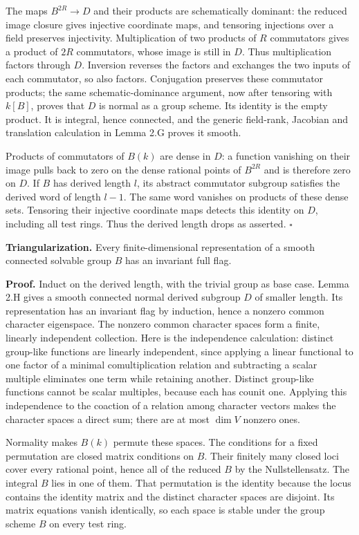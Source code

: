 \documentclass[11pt,a4paper,openany]{report}
\begin{document}
The maps \(B^{2R}\to D\) and their products are schematically dominant: the reduced image closure gives injective coordinate maps, and tensoring injections over a field preserves injectivity. Multiplication of two products of \(R\) commutators gives a product of \(2R\) commutators, whose image is still in \(D\). Thus multiplication factors through \(D\). Inversion reverses the factors and exchanges the two inputs of each commutator, so also factors. Conjugation preserves these commutator products; the same schematic-dominance argument, now after tensoring with \(k[B]\), proves that \(D\) is normal as a group scheme. Its identity is the empty product. It is integral, hence connected, and the generic field-rank, Jacobian and translation calculation in Lemma 2.G proves it smooth.

Products of commutators of \(B(k)\) are dense in \(D\): a function vanishing on their image pulls back to zero on the dense rational points of \(B^{2R}\) and is therefore zero on \(D\). If \(B\) has derived length \(l\), its abstract commutator subgroup satisfies the derived word of length \(l-1\). The same word vanishes on products of these dense sets. Tensoring their injective coordinate maps detects this identity on \(D\), including all test rings. Thus the derived length drops as asserted. \(\square\)

\textbf{Triangularization.} Every finite-dimensional representation of a smooth connected solvable group \(B\) has an invariant full flag.

\textbf{Proof.} Induct on the derived length, with the trivial group as base case. Lemma 2.H gives a smooth connected normal derived subgroup \(D\) of smaller length. Its representation has an invariant flag by induction, hence a nonzero common character eigenspace. The nonzero common character spaces form a finite, linearly independent collection. Here is the independence calculation: distinct group-like functions are linearly independent, since applying a linear functional to one factor of a minimal comultiplication relation and subtracting a scalar multiple eliminates one term while retaining another. Distinct group-like functions cannot be scalar multiples, because each has counit one. Applying this independence to the coaction of a relation among character vectors makes the character spaces a direct sum; there are at most \(\dim V\) nonzero ones.

Normality makes \(B(k)\) permute these spaces. The conditions for a fixed permutation are closed matrix conditions on \(B\). Their finitely many closed loci cover every rational point, hence all of the reduced \(B\) by the Nullstellensatz. The integral \(B\) lies in one of them. That permutation is the identity because the locus contains the identity matrix and the distinct character spaces are disjoint. Its matrix equations vanish identically, so each space is stable under the group scheme \(B\) on every test ring.
\end{document}
